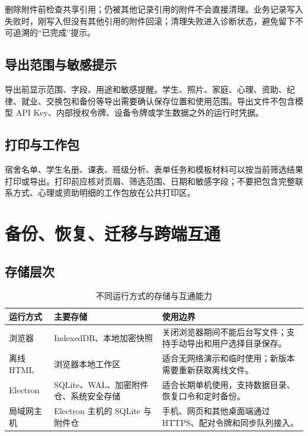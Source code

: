 \documentclass[UTF8,zihao=-4,oneside]{ctexrep}
\begin{document}
删除附件前检查共享引用；仍被其他记录引用的附件不会直接清理。业务记录写入失败时，刚写入但没有其他引用的附件回滚；清理失败进入诊断状态，避免留下不可追溯的“已完成”提示。

\section{导出范围与敏感提示}

导出前显示范围、字段、用途和敏感提醒。学生、照片、家庭、心理、资助、纪律、就业、交换包和备份等导出需要确认保存位置和使用范围。导出文件不包含模型 API Key、内部授权令牌、设备令牌或学生数据之外的运行时凭据。

\section{打印与工作包}

宿舍名单、学生名册、课表、班级分析、表单任务和模板材料可以按当前筛选结果打印或导出。打印前应核对页眉、筛选范围、日期和敏感字段；不要把包含完整联系方式、心理或资助明细的工作包放在公共打印区。

\chapter{备份、恢复、迁移与跨端互通}

\section{存储层次}

\begin{table}[H]
\centering
\caption{不同运行方式的存储与互通能力}
\begin{tabularx}{\textwidth}{B{35mm} P{40mm} Y}
\toprule
运行方式 & 主要存储 & 使用边界 \\
\midrule
浏览器 & IndexedDB、本地加密快照 & 关闭浏览器期间不能后台写文件；支持手动导出和用户选择目录保存。 \\
离线 HTML & 浏览器本地工作区 & 适合无网络演示和临时使用；新版本需要重新获取离线文件。 \\
Electron & SQLite、WAL、加密附件仓、系统安全存储 & 适合长期单机使用，支持数据目录、恢复口令和定时备份。 \\
局域网主机 & Electron 主机的 SQLite 与附件仓 & 手机、网页和其他桌面端通过 HTTPS、配对令牌和同步队列接入。 \\
\bottomrule
\end{tabularx}
\end{table}
\end{document}

